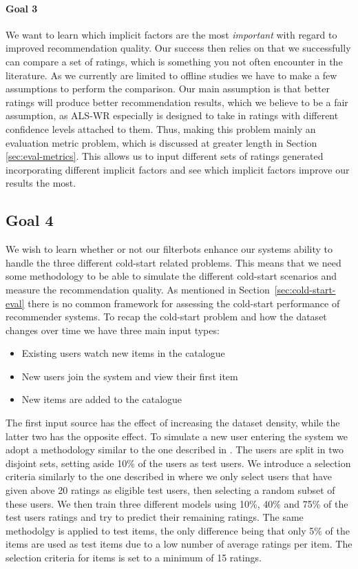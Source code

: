 \paragraph{Goal 3}

We want to learn which implicit factors are the most \emph{important} with regard to
improved recommendation quality. Our success then relies on that we successfully can compare
a set of ratings, which is something you not often encounter in the literature. As we currently
are limited to offline studies we have to make a few assumptions to perform the comparison.
Our main assumption is that better ratings will produce better recommendation results,
which we believe to be a fair assumption, as ALS-WR especially is designed to take
in ratings with different confidence levels attached to them. Thus, making this
problem mainly an evaluation metric problem, which is discussed at greater
length in Section \ref{sec:eval-metrics}. This allows us to input different sets
of ratings generated incorporating different implicit factors and see which implicit
factors improve our results the most.

\subsection{Goal 4}

We wish to learn whether or not our filterbots enhance our systems ability to handle
the three different cold-start related problems. This means that we need some methodology
to be able to simulate the different cold-start scenarios and measure the recommendation quality.
As mentioned in Section~\ref{sec:cold-start-eval} there is no common framework for assessing 
the cold-start performance of recommender systems. To recap the cold-start problem and how
the dataset changes over time we have three main input types:

\begin{itemize}
	\item 	Existing users watch new items in the catalogue
	\item	New users join the system and view their first item
	\item	New items are added to the catalogue
\end{itemize}

The first input source has the effect of increasing the dataset density, while
the latter two has the opposite effect. To simulate a new user entering the system
we adopt a methodology similar to the one described in \cite{Stern2009, Lam2008}. The
users are split in two disjoint sets, setting aside 10\% of the users as test users.
We introduce a selection criteria similarly to the one described in \cite{Rashid2002, Rashid2008}
where we only select users that have given above 20 ratings as eligible test users,
then selecting a random subset of these users.
We then train three different models using 10\%, 40\% and 75\% of the test users
ratings and try to predict their remaining ratings. The same methodolgy is applied
to test items, the only difference being that only 5\% of the items are used as 
test items due to a low number of average ratings per item. The selection criteria
for items is set to a minimum of 15 ratings.


